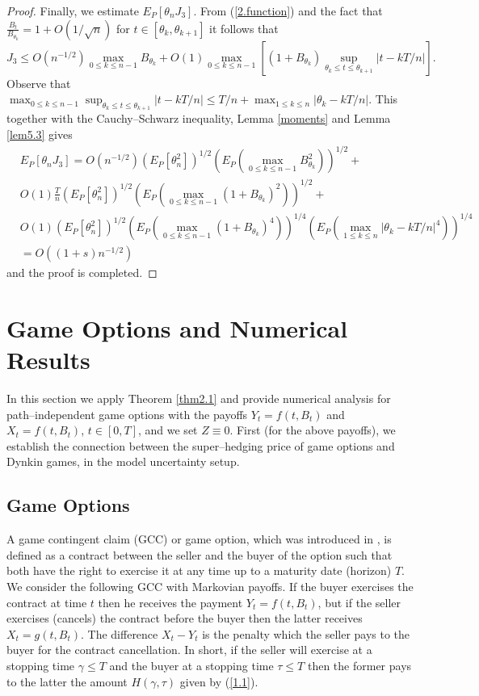 \documentclass{amsart}
\numberwithin{equation}{section}
\begin{document}
\begin{proof}
Finally, we estimate $E_P[\theta_n J_3].$
From (\ref{2.function})
and the fact that
$\frac{B_t}{B_{\theta_k}}=1+O(1/\sqrt n)$
for $t\in [\theta_k,\theta_{k+1}]$
it follows that
\[J_3\leq
O(n^{-1/2})\max_{0\leq k\leq n-1}B_{\theta_k}+O(1)\max_{0\leq k\leq n-1}[(1+B_{\theta_k})\sup_{\theta_k\leq t\leq\theta_{k+1}}|t-kT/n|].\]
Observe that $\max_{0\leq k\leq n-1}\sup_{\theta_k\leq t\leq\theta_{k+1}}|t-kT/n|\leq T/n+\max_{1\leq k\leq n}|\theta_k-k T/n|$.
This together with the Cauchy--Schwarz inequality, Lemma \ref{moments} and Lemma \ref{lem5.3} gives
\begin{eqnarray*}
&E_P[\theta_n J_3]=O(n^{-1/2})\left(E_P\left[\theta^2_n\right]\right)^{1/2} \left(E_P\left(\max_{0\leq k\leq n-1}B^2_{\theta_k}\right)\right)^{1/2}+\\
&O(1)\frac{T}{n}\left(E_P\left[\theta^2_n\right]\right)^{1/2}\left(E_P\left(\max_{0\leq k\leq n-1}(1+B_{\theta_k})^2\right)\right)^{1/2}+\\
&O(1)\left(E_P\left[\theta^2_n\right]\right)^{1/2}\left(E_P\left(\max_{0\leq k\leq n-1}(1+B_{\theta_k})^4\right)\right)^{1/4}
\left(E_P\left(\max_{1\leq k\leq n}|\theta_k-k T/n|^4\right)\right)^{1/4}\\
&=O\left((1+s)n^{-1/2}\right)
\end{eqnarray*}
and the proof is completed.
\end{proof}
\section{Game Options and Numerical Results}\label{sec:6}\setcounter{equation}{0}
In this section we apply Theorem \ref{thm2.1} and provide
numerical analysis for
path--independent game options with the payoffs
$Y_t=f(t,B_t)$ and $X_t=f(t,B_t)$, $t\in [0,T]$, and we set $Z\equiv 0$.
First (for the above payoffs), we establish the connection between the super--hedging price of game options and Dynkin games,
in the model uncertainty setup.
\subsection{Game Options}
A game contingent claim (GCC) or game option, which was introduced in
\cite{K}, is defined
as a contract between the seller and the buyer of the option such
that both have the right to exercise it at any time up to a
maturity date (horizon) $T$. We consider the following GCC with Markovian payoffs.
If the buyer exercises the contract
at time $t$ then he receives the payment $Y_t=f(t,B_t)$, but if the seller
exercises (cancels) the contract before the buyer then the latter
receives $X_t=g(t,B_t)$. The difference $X_t-Y_t$ is the penalty
which the seller pays to the buyer for the contract cancellation.
In short, if the seller will exercise at a stopping time
$\gamma\leq{T}$ and the buyer at a stopping time $\tau\leq{T}$
then the former pays to the latter the amount
$H(\gamma,\tau)$ given by (\ref{1.1}).
\end{document}
